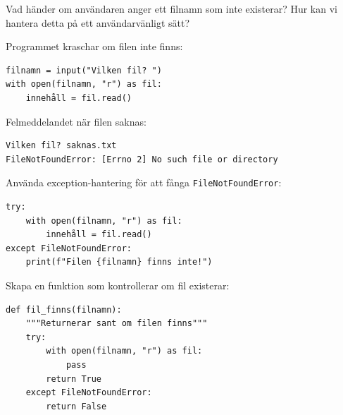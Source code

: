 \begin{frame}[fragile]
  \begin{exercise}
    Vad händer om användaren anger ett filnamn som inte existerar?
    Hur kan vi hantera detta på ett användarvänligt sätt?
  \end{exercise}
\end{frame}


\begin{frame}[fragile]
  \begin{example}
    Programmet kraschar om filen inte finns:
    \begin{verbatim}
filnamn = input("Vilken fil? ")
with open(filnamn, "r") as fil:
    innehåll = fil.read()
    \end{verbatim}
  \end{example}

  \pause

  \begin{example}[Körning]
    Felmeddelandet när filen saknas:
    \begin{verbatim}
Vilken fil? saknas.txt
FileNotFoundError: [Errno 2] No such file or directory
    \end{verbatim}
  \end{example}
\end{frame}

\begin{frame}[fragile]
  \begin{example}
    Använda exception-hantering för att fånga \texttt{FileNotFoundError}:
    \begin{verbatim}
try:
    with open(filnamn, "r") as fil:
        innehåll = fil.read()
except FileNotFoundError:
    print(f"Filen {filnamn} finns inte!")
    \end{verbatim}
  \end{example}
\end{frame}


\begin{frame}[fragile]
  \begin{example}
    Skapa en funktion som kontrollerar om fil existerar:
    \begin{verbatim}
def fil_finns(filnamn):
    """Returnerar sant om filen finns"""
    try:
        with open(filnamn, "r") as fil:
            pass
        return True
    except FileNotFoundError:
        return False
    \end{verbatim}
  \end{example}
\end{frame}


